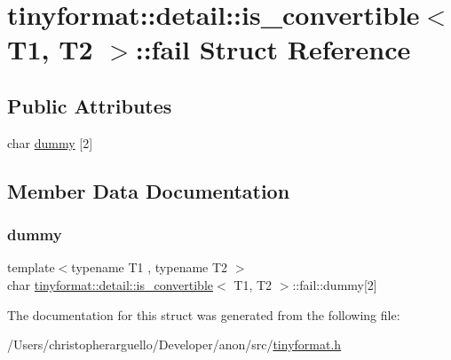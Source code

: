 \hypertarget{structtinyformat_1_1detail_1_1is__convertible_1_1fail}{}\section{tinyformat\+:\+:detail\+:\+:is\+\_\+convertible$<$ T1, T2 $>$\+:\+:fail Struct Reference}
\label{structtinyformat_1_1detail_1_1is__convertible_1_1fail}
\subsection*{Public Attributes}
\begin{DoxyCompactItemize}
\item 
char \mbox{\hyperlink{structtinyformat_1_1detail_1_1is__convertible_1_1fail_a5d18f7fcac212bbe55692586aee8954d}{dummy}} \mbox{[}2\mbox{]}
\end{DoxyCompactItemize}


\subsection{Member Data Documentation}
\mbox{\label{structtinyformat_1_1detail_1_1is__convertible_1_1fail_a5d18f7fcac212bbe55692586aee8954d}} 
\subsubsection{\texorpdfstring{dummy}{dummy}}
{\footnotesize\ttfamily template$<$typename T1 , typename T2 $>$ \\
char \mbox{\hyperlink{structtinyformat_1_1detail_1_1is__convertible}{tinyformat\+::detail\+::is\+\_\+convertible}}$<$ T1, T2 $>$\+::fail\+::dummy\mbox{[}2\mbox{]}}



The documentation for this struct was generated from the following file\+:\begin{DoxyCompactItemize}
\item 
/\+Users/christopherarguello/\+Developer/anon/src/\mbox{\hyperlink{tinyformat_8h}{tinyformat.\+h}}\end{DoxyCompactItemize}
